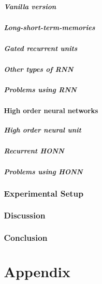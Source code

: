 \documentclass[a4paper, twoside]{article}
\begin{document}
\subsubsection{Vanilla version}
\label{ssub:vanilla_version}

\subsubsection{Long-short-term-memories}
\label{ssub:long_short_term_memories}

\subsubsection{Gated recurrent units}
\label{ssub:gated_recurrent_units}


\subsubsection{Other types of RNN}
\label{ssub:other_types_of_rnn}

\subsubsection{Problems using RNN}
\label{ssub:problems_using_rnn}


\subsection{High order neural networks}
\label{sub:high_order_neural_networks}

\subsubsection{High order neural unit}
\label{ssub:high_order_neural_unit}

\subsubsection{Recurrent HONN}
\label{ssub:recurrent_honn}

\subsubsection{Problems using HONN}
\label{ssub:problems_using_honn}


\section{Experimental Setup}
\label{sec:experimental_setup}


\section{Discussion}
\label{sec:discussion}

\section{Conclusion}
\label{sec:conclusion}



\newpage
\nocite{*}
\printbibliography
\newpage

\appendix
\part*{Appendix}
\end{document}
